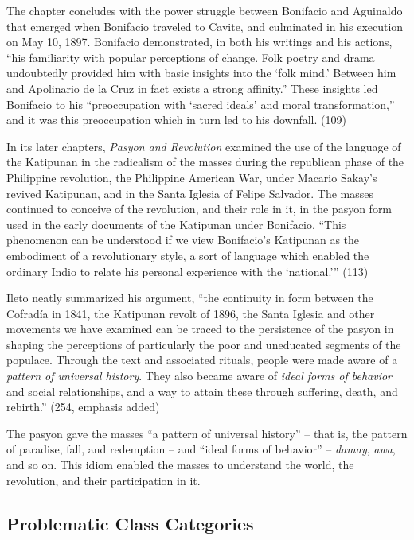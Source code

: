 The chapter concludes with the power struggle between Bonifacio and Aguinaldo that emerged when Bonifacio traveled to Cavite, and culminated in his execution on May 10, 1897. Bonifacio demonstrated, in both his writings and his actions, \enquote{his familiarity with popular perceptions of change. Folk poetry and drama undoubtedly provided him with basic insights into the \enquote{folk mind.} Between him and Apolinario de la Cruz in fact exists a strong affinity.} These insights led Bonifacio to his \enquote{preoccupation with \enquote{sacred ideals} and moral transformation,} and it was this preoccupation which in turn led to his downfall. (109)

In its later chapters, \textit{Pasyon and Revolution} examined the use of the language of the Katipunan in the radicalism of the masses during the republican phase of the Philippine revolution, the Philippine American War, under Macario Sakay's revived Katipunan, and in the Santa Iglesia of Felipe Salvador. The masses continued to conceive of the revolution, and their role in it, in the pasyon form used in the early documents of the Katipunan under Bonifacio. \enquote{This phenomenon can be understood if we view Bonifacio's Katipunan as the embodiment of a revolutionary style, a sort of language which enabled the ordinary Indio to relate his personal experience with the \enquote{national.}} (113)

Ileto neatly summarized his argument, \enquote{the continuity in form between the Cofrad\'ia in 1841, the Katipunan revolt of 1896, the Santa Iglesia and other movements we have examined can be traced to the persistence of the pasyon in shaping the perceptions of particularly the poor and uneducated segments of the populace. Through the text and associated rituals, people were made aware of a \textit{pattern of universal history}. They also became aware of \textit{ideal forms of behavior} and social relationships, and a way to attain these through suffering, death, and rebirth.} (254, emphasis added)

The pasyon gave the masses \enquote{a pattern of universal history} -- that is, the pattern of paradise, fall, and redemption -- and \enquote{ideal forms of behavior} -- \textit{damay}, \textit{awa}, and so on. This idiom enabled the masses to understand the world, the revolution, and their participation in it.

\subsection{Problematic Class Categories} 

